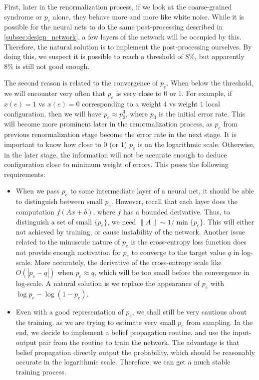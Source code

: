 First, later in the renormalization process, if we look at the coarse-grained syndrome or $p_e$ alone, they behave more and more like white noise.
While it is possible for the neural nets to do the same post-processing described in \autoref{subsec:design_network}, a few layers of the network will be occupied by this.
Therefore, the natural solution is to implement the post-processing ourselves.
By doing this, we suspect it is possible to reach a threshold of $8\%$, but apparently $8\%$ is still not good enough.

The second reason is related to the convergence of $p_e$.
When below the threshold, we will encounter very often that $p_e$ is very close to $0$ or $1$.
For example, if $x(e)=1$ vs $x(e)=0$ corresponding to a weight $4$ vs weight $1$ local configuration, then we will have $p_e \approx p_0^3$, where $p_0$ is the initial error rate.
This will become more prominent later in the renormalization process, as $p_e$ from previous renormalization stage become the error rate in the next stage.
It is important to know how close to $0$ (or $1$) $p_e$ is on the logarithmic scale.
Otherwise, in the later stage, the information will not be accurate enough to deduce configuration close to minimum weight of errors.
This poses the following requirements:
\begin{itemize}
	\item When we pass $p_e$ to some intermediate layer of a neural net, it should be able to distinguish between small $p_e$.
	However, recall that each layer does the computation $f(Ax + b)$, where $f$ has a bounded derivative.
	Thus, to distinguish a set of small $\{p_e\}$, we need $\| A \| \sim 1/\min \{p_e\}$.
	This will either not achieved by training, or cause instability of the network.
	Another issue related to the minuscule nature of $p_e$ is the cross-entropy loss function does not provide enough motivation for $p_e$ to converge to the target value $q$ in log-scale.
	More accurately, the derivative of the cross-entropy scale like $O(|p_e - q|)$ when $p_e \approx q$, which will be too small before the convergence in log-scale.
	A natural solution is we replace the appearance of $p_e$ with $\log p_e -\log (1-p_e)$.
	\item Even with a good representation of $p_e$, we shall still be very cautious about the training, as we are trying to estimate very small $p_e$ from sampling.
	In the end, we decide to implement a belief propagation routine, and use the input-output pair from the routine to train the network.
	The advantage is that belief propagation directly output the probability, which should be reasonably accurate in the logarithmic scale.
	Therefore, we can get a much stable training process.
\end{itemize}


